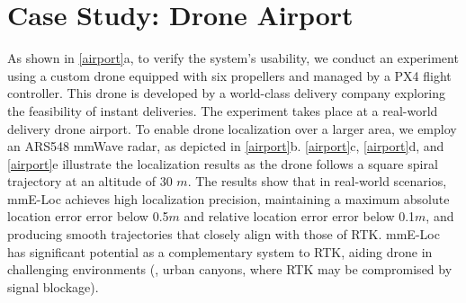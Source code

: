 \section{Case Study: Drone Airport}
As shown in \fig \ref{airport}a, to verify the system's usability, we conduct an experiment using a custom drone equipped with six propellers and managed by a PX4 flight controller. 
This drone is developed by a world-class delivery company exploring the feasibility of instant deliveries.
The experiment takes place at a real-world delivery drone airport.
To enable drone localization over a larger area, we employ an ARS548 mmWave radar, as depicted in \fig \ref{airport}b. 
\fig \ref{airport}c, \fig \ref{airport}d, and \fig \ref{airport}e illustrate the localization results as the drone follows a square spiral trajectory at an altitude of 30 $m$.
The results show that in real-world scenarios, mmE-Loc achieves high localization precision, maintaining a maximum absolute location error error below 0.5$m$ and relative location error error below 0.1$m$, and producing smooth trajectories that closely align with those of RTK. 
mmE-Loc has significant potential as a complementary system to RTK, aiding drone in challenging environments (\eg, urban canyons, where RTK may be compromised by signal blockage).
